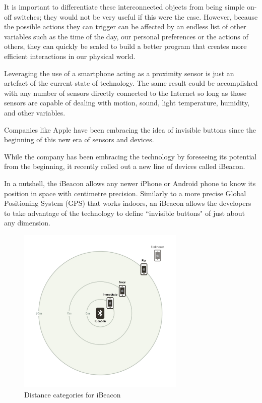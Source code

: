 It is important to differentiate these interconnected objects from being simple on-off switches; they would not be very useful if this were the case. However, because the possible actions they can trigger can be affected by an endless list of other variables such as the time of the day, our personal preferences or the actions of others, they can quickly be scaled to build a better program that creates more efficient interactions in our physical world.

Leveraging the use of a smartphone acting as a proximity sensor is just an artefact of the current state of technology. The same result could be accomplished with any number of sensors directly connected to the Internet so long as those sensors are capable of dealing with motion, sound, light temperature, humidity, and other variables.

Companies like Apple have been embracing the idea of invisible buttons since the beginning of this new era of sensors and devices. 

While the company has been embracing the technology by foreseeing its potential from the beginning, it recently rolled out a new line of devices called iBeacon.

In a nutshell, the iBeacon allows any newer iPhone or Android phone to know its position in space with centimetre precision. Similarly to a more precise Global Positioning System (GPS) that works indoors, an iBeacon allows the developers to take advantage of the technology to define ``invisible buttons" of just about any dimension.

\vspace{0.5cm}
\begin{figure}[htbp]
  \centering
    \includegraphics[height=8cm]{images/ibeacon-distance.jpg}
  \caption{Distance categories for iBeacon}
  \label{fig:ibeacon}
\end{figure}
\vspace{0.5cm}


